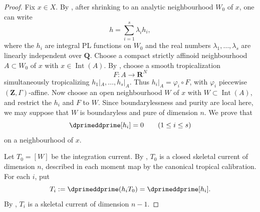 \begin{proof}
Fix $x\in X$.  By \cite[Proposition~5.8 and Lemma~5.10]{GJR26}, after
shrinking to an analytic neighbourhood $W_0$ of $x$, one can write
\begin{equation}
\label{eq:ch18-zero-current-independent}
                         h=\sum_{i=1}^{s}\lambda_i h_i,
\end{equation}
where the $h_i$ are integral PL functions on $W_0$ and the real numbers
$\lambda_1,\ldots,\lambda_s$ are linearly independent over $\mathbf Q$.
Choose a compact strictly affinoid neighbourhood $A\subset W_0$ of $x$ with
$x\in\operatorname{Int}(A)$.  By
\cite[Proposition~8.3 and \S8.4]{GJR26}, choose a smooth tropicalization
\[
                         F:A\longrightarrow\mathbf R^N
\]
simultaneously tropicalizing $h_1|_A,\ldots,h_s|_A$.  Thus
$h_i|_A=\varphi_i\circ F$, with $\varphi_i$ piecewise
$(\mathbf Z,\Gamma)$-affine.  Now choose an open neighbourhood $W$ of $x$
with $W\subset\operatorname{Int}(A)$, and restrict the $h_i$ and $F$ to
$W$.  Since boundarylessness and purity are local here, we may suppose that
$W$ is boundaryless and pure of dimension $n$.  We prove that
\begin{equation}
\label{eq:ch18-zero-current-integral}
                         \dprimeddprime[h_i]=0
                         \qquad(1\leq i\leq s)
\end{equation}
on a neighbourhood of $x$.

Let $T_0=[W]$ be the integration current.  By
\cite[Example~7.5.3]{CLD25}, $T_0$ is a closed skeletal current of dimension
$n$, described in each moment map by the canonical tropical calibration.
For each $i$, put
\[
                         T_i:=\dprimeddprime(h_iT_0)
                             =\dprimeddprime[h_i].
\]
By \cite[Theorem~8.10.3]{CLD25}, $T_i$ is a skeletal current of dimension
$n-1$.


\end{proof}
